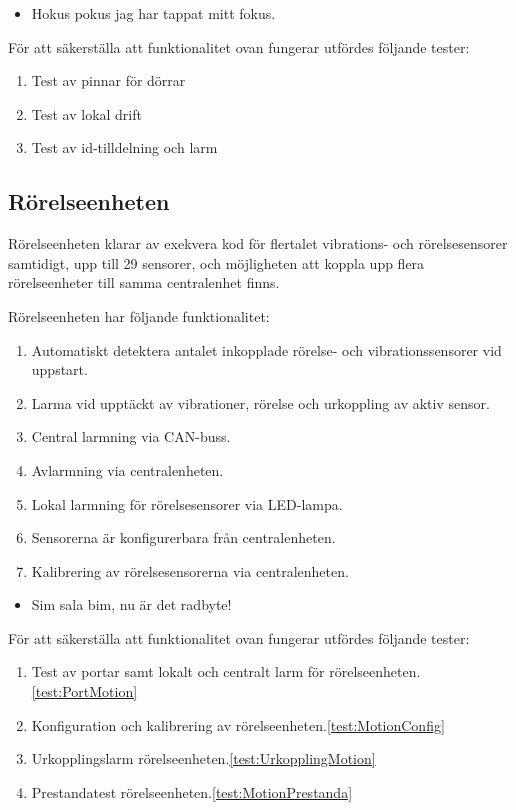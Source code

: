 \documentclass{article}
\begin{document}
 \begin{itemize}
\color{white}
\item Hokus pokus jag har tappat mitt fokus.
\end{itemize}

 För att säkerställa att funktionalitet ovan fungerar utfördes följande tester:
 \begin{enumerate}
     \item Test av pinnar för dörrar
     \item Test av lokal drift
     \item Test av id-tilldelning och larm
 \end{enumerate}

 \subsection{Rörelseenheten}
Rörelseenheten klarar av  exekvera kod för flertalet vibrations- och rörelsesensorer samtidigt, upp till 29 sensorer,
och möjligheten att koppla upp flera rörelseenheter till samma centralenhet finns.

 Rörelseenheten har följande funktionalitet:
 \begin{enumerate}
 	\item Automatiskt detektera antalet inkopplade rörelse- och vibrationssensorer vid uppstart.
	\item Larma vid upptäckt av vibrationer, rörelse och urkoppling av aktiv sensor.
    	\item Central larmning via CAN-buss.
	\item Avlarmning via centralenheten.
	\item Lokal larmning för rörelsesensorer via LED-lampa.
	\item Sensorerna är konfigurerbara från centralenheten.
	\item Kalibrering av rörelsesensorerna via centralenheten.
 \end{enumerate}

 \begin{itemize}
\color{white}
\item Sim sala bim, nu är det radbyte!
\end{itemize}

 För att säkerställa att funktionalitet ovan fungerar utfördes följande tester:
 \begin{enumerate}
	\item Test av portar samt lokalt och centralt larm för rörelseenheten.\ref{test:PortMotion}
	\item Konfiguration och kalibrering av rörelseenheten.\ref{test:MotionConfig}
	\item Urkopplingslarm rörelseenheten.\ref{test:UrkopplingMotion}
	\item Prestandatest rörelseenheten.\ref{test:MotionPrestanda}
 \end{enumerate}
\end{document}
